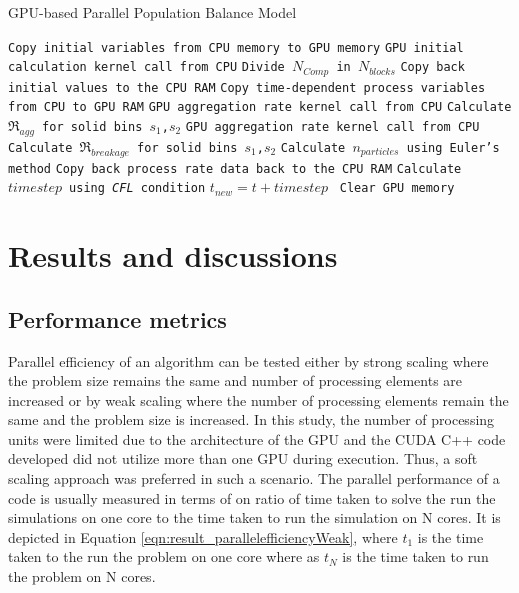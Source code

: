 \documentclass[preprint,10pt,authoryear,review]{elsarticle}
\begin{document}
\begin{linenumbers}
\begin{algorithm}
     \scriptsize
     \caption{GPU-based Parallel Population Balance Model}
     \label{alg:GPUparallelPBM}
     \begin{algorithmic}[1]
     \State\texttt{Copy initial variables from CPU memory to GPU memory}
     \State \texttt{GPU initial calculation kernel call from CPU}
     \State \texttt{Divide $N_{Comp}$ in $N_{blocks}$}
     \State \texttt{Copy back initial values to the CPU RAM}
	 \State \texttt{Copy time-dependent process variables from CPU to GPU RAM}
     \State \texttt{GPU aggregation rate kernel call from CPU}
     \State \texttt{Calculate $\Re_{agg}$ for solid bins $s_1$,$s_2$}
	 \State \texttt{GPU aggregation rate kernel call from CPU}     
     \State \texttt{Calculate $\Re_{breakage}$ for solid bins $s_1$,$s_2$}
     \State \texttt{Calculate $n_{particles}$ using Euler's method}
     \State \texttt{Copy back process rate data back to the CPU RAM}
     \State \texttt{Calculate $timestep$ using \textit{CFL} condition}
     \State \texttt{$t_{new} = t + timestep$ }
     \EndWhile
     \State \texttt{Clear GPU memory}
     \EndProcedure
     \end{algorithmic}
 \end{algorithm}

\section{Results and discussions}
\label{secResults}
\subsection{Performance metrics}
Parallel efficiency of an algorithm can be tested either by strong scaling 
where the problem size remains the same and number of processing elements 
are increased or by weak scaling where the number of processing elements 
remain the same and the problem size is increased. In this study, the 
number of processing units were limited due to the architecture of the 
GPU and the CUDA C++ code developed did not utilize more than one GPU 
during execution. Thus, a soft scaling approach was preferred in such a 
scenario. The parallel performance of a code is usually measured in 
terms of on ratio of time taken to solve the run the simulations on one 
core to the time taken to run the simulation on N cores. It is depicted in
Equation \ref{eqn:result_parallelefficiencyWeak}, where $t_1$ is the time taken 
to the run the problem on one core where as $t_N$ is the time taken to 
run the problem on N cores.


\end{linenumbers}
\end{document}
